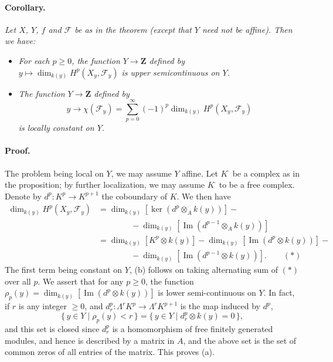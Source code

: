 
\DeclareMathOperator{\Image}{Im}


\paragraph{Corollary.}
\textit{Let $X$, $Y$, $f$ and $\mathcal{F}$ be as in the theorem (except
that $Y$ need not be affine). Then we have:}
\begin{itemize}
  \item[(a)] \textit{For each $p \geq 0$, the function $Y \to \mathbf{Z}$
    defined by \\
    $y \longmapsto \dim_{k(y)} H^p(X_y, \mathcal{F}_y)$ is upper
    semicontinuous on $Y$.}
  \item[(b)] \textit{The function $Y \to \mathbf{Z}$ defined by}
    \[
      y \to \chi(\mathcal{F}_y)
        = \sum_{p=0}^{\infty} (-1)^p \dim_{k(y)} H^p(X_y, \mathcal{F}_y)
    \]
    \textit{is locally constant on $Y$.}
\end{itemize}

\paragraph{Proof.}
The problem being local on $Y$, we may assume $Y$ affine. Let $K^{\cdot}$ be
a complex as in the proposition; by further localization, we may assume
$K^{\cdot}$ to be a free complex. Denote by $d^p : K^p \to K^{p+1}$ the
coboundary of $K$. We then have
\[
\begin{aligned}
  \dim_{k(y)} H^p(X_y, \mathcal{F}_y)
    &= \dim_{k(y)}[\ker(d^p \otimes_A k(y))] - {} \\
    &\qquad\qquad - \dim_{k(y)}[\Image(d^{p-1} \otimes_A k(y))] \\
    &= \dim_{k(y)}[K^p \otimes k(y)]
       - \dim_{k(y)}[\Image(d^p \otimes k(y))] - {} \\
    &\qquad\qquad - \dim_{k(y)}[\Image(d^{p-1} \otimes k(y))].
       \qquad (*)
\end{aligned}
\]
The first term being constant on $Y$, (b) follows on taking alternating sum
of $(*)$ over all $p$. We assert that for any $p \geq 0$, the function
$\rho_p(y) = \dim_{k(y)}[\Image(d^p \otimes k(y))]$ is lower
semi-continuous on $Y$. In fact, if $r$ is any integer $\geq 0$, and
$d^p_r : \Lambda^r K^p \to \Lambda^r K^{p+1}$ is the map induced by $d^p$,
\[
  \{\, y \in Y \mid \rho_p(y) < r \,\}
    = \{\, y \in Y \mid d^p_r \otimes k(y) = 0 \,\},
\]
and this set is closed since $d^p_r$ is a homomorphism of free finitely
generated modules, and hence is described by a matrix in $A$, and the above
set is the set of common zeros of all entries of the matrix. This proves
(a).

